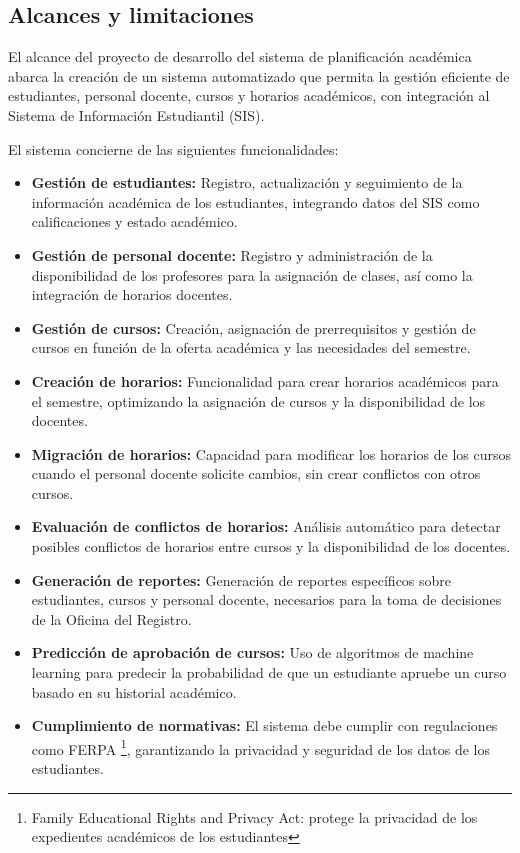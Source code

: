 \subsection{Alcances y limitaciones}

El alcance del proyecto de desarrollo del sistema de planificación académica abarca la creación de un sistema automatizado que permita la gestión eficiente de estudiantes, personal docente, cursos y horarios académicos, con integración al Sistema de Información Estudiantil (SIS). 

El sistema concierne de las siguientes funcionalidades:
\begin{itemize}
    \item \textbf{Gestión de estudiantes:} Registro, actualización y seguimiento de la información académica de los estudiantes, integrando datos del SIS como calificaciones y estado académico.
    \item \textbf{Gestión de personal docente:} Registro y administración de la disponibilidad de los profesores para la asignación de clases, así como la integración de horarios docentes.
    \item \textbf{Gestión de cursos:} Creación, asignación de prerrequisitos y gestión de cursos en función de la oferta académica y las necesidades del semestre.
    \item \textbf{Creación de horarios:} Funcionalidad para crear horarios académicos para el semestre, optimizando la asignación de cursos y la disponibilidad de los docentes.
    \item \textbf{Migración de horarios:} Capacidad para modificar los horarios de los cursos cuando el personal docente solicite cambios, sin crear conflictos con otros cursos.
    \item \textbf{Evaluación de conflictos de horarios:} Análisis automático para detectar posibles conflictos de horarios entre cursos y la disponibilidad de los docentes.
    \item \textbf{Generación de reportes:} Generación de reportes específicos sobre estudiantes, cursos y personal docente, necesarios para la toma de decisiones de la Oficina del Registro.
    \item \textbf{Predicción de aprobación de cursos:} Uso de algoritmos de machine learning para predecir la probabilidad de que un estudiante apruebe un curso basado en su historial académico.
    \item \textbf{Cumplimiento de normativas:} El sistema debe cumplir con regulaciones como FERPA \footnote{Family Educational Rights and Privacy Act: protege la privacidad de los expedientes académicos de los estudiantes}, garantizando la privacidad y seguridad de los datos de los estudiantes.
\end{itemize}

